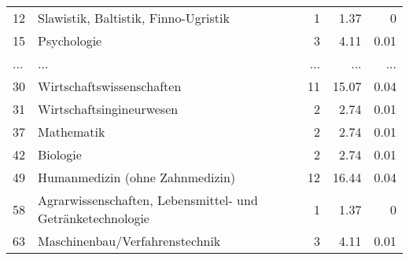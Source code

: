 \begin{longtable}{lXrrr}
        12 & \multicolumn{1}{X}{Slawistik, Baltistik, Finno-Ugristik} & %
          \num{1} &
          \num[round-mode=places,round-precision=2]{1.37} &
          \num[round-mode=places,round-precision=2]{0} \\
        15 & \multicolumn{1}{X}{Psychologie} & %
          \num{3} &
          \num[round-mode=places,round-precision=2]{4.11} &
          \num[round-mode=places,round-precision=2]{0.01} \\
       ... & ... & ... & ... & ... \\
        30 & \multicolumn{1}{X}{Wirtschaftswissenschaften} & %
          \num{11} &
          \num[round-mode=places,round-precision=2]{15.07} &
          \num[round-mode=places,round-precision=2]{0.04} \\

        31 & \multicolumn{1}{X}{Wirtschaftsingineurwesen} & %
          \num{2} &
          \num[round-mode=places,round-precision=2]{2.74} &
          \num[round-mode=places,round-precision=2]{0.01} \\

        37 & \multicolumn{1}{X}{Mathematik} & %
          \num{2} &
          \num[round-mode=places,round-precision=2]{2.74} &
          \num[round-mode=places,round-precision=2]{0.01} \\

        42 & \multicolumn{1}{X}{Biologie} & %
          \num{2} &
          \num[round-mode=places,round-precision=2]{2.74} &
          \num[round-mode=places,round-precision=2]{0.01} \\

        49 & \multicolumn{1}{X}{Humanmedizin (ohne Zahnmedizin)} & %
          \num{12} &
          \num[round-mode=places,round-precision=2]{16.44} &
          \num[round-mode=places,round-precision=2]{0.04} \\

        58 & \multicolumn{1}{X}{Agrarwissenschaften, Lebensmittel- und Getränketechnologie} & %
          \num{1} &
          \num[round-mode=places,round-precision=2]{1.37} &
          \num[round-mode=places,round-precision=2]{0} \\

        63 & \multicolumn{1}{X}{Maschinenbau/Verfahrenstechnik} & %
          \num{3} &
          \num[round-mode=places,round-precision=2]{4.11} &
          \num[round-mode=places,round-precision=2]{0.01} \\


\end{longtable}
